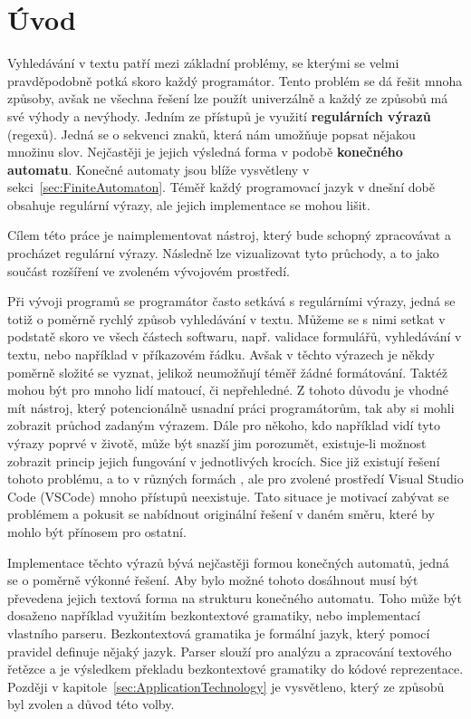 \chapter{Úvod}\label{sec:Introduction}

Vyhledávání v textu patří mezi základní problémy, se kterými se velmi pravděpodobně potká skoro každý programátor. 
Tento problém se dá řešit mnoha způsoby, avšak ne všechna řešení lze použít univerzálně a každý ze způsobů má své výhody a nevýhody.
Jedním ze přístupů je využití \textbf{regulárních výrazů} (regexů). 
Jedná se o sekvenci znaků, která nám umožňuje popsat nějakou množinu slov.
Nejčastěji je jejich výsledná forma v podobě \textbf{konečného automatu}. 
Konečné automaty jsou blíže vysvětleny v sekci~\ref{sec:FiniteAutomaton}.
Téměř každý programovací jazyk v dnešní době obsahuje regulární výrazy, ale jejich implementace se mohou lišit.

Cílem této práce je naimplementovat nástroj, který bude schopný zpracovávat a procházet regulární výrazy. 
Následně lze vizualizovat tyto průchody, a to jako součást rozšíření ve zvoleném vývojovém prostředí.

Při vývoji programů se programátor často setkává s regulárními výrazy, jedná se totiž o poměrně rychlý způsob vyhledávání v textu. 
Můžeme se s nimi setkat v podstatě skoro ve všech částech softwaru, např. validace formulářů, vyhledávání v textu, nebo například v příkazovém řádku.
Avšak v těchto výrazech je někdy poměrně složité se vyznat, jelikož neumožňují téměř žádné formátování. 
Taktéž mohou být pro mnoho lidí matoucí, či nepřehledné.
Z tohoto důvodu je vhodné mít nástroj, který potencionálně usnadní práci programátorům, tak aby si mohli zobrazit průchod zadaným výrazem.
Dále pro někoho, kdo například vidí tyto výrazy poprvé v životě, může být snazší jim porozumět, existuje-li možnost zobrazit princip jejich fungování v jednotlivých krocích.
Sice již existují řešení tohoto problému, a to v různých formách \cite{Dib, Regexper, RegExr}, ale pro zvolené prostředí Visual Studio Code (VSCode) mnoho přístupů neexistuje.
Tato situace je motivací zabývat se problémem a pokusit se nabídnout originální řešení v daném směru, které by mohlo být přínosem pro ostatní.

Implementace těchto výrazů bývá nejčastěji formou konečných automatů, jedná se o poměrně výkonné řešení. 
Aby bylo možné tohoto dosáhnout musí být převedena jejich textová forma na strukturu konečného automatu.
Toho může být dosaženo například využitím bezkontextové gramatiky, nebo implementací vlastního parseru.
Bezkontextová gramatika je formální jazyk, který pomocí pravidel definuje nějaký jazyk.
Parser slouží pro analýzu a zpracování textového řetězce a je výsledkem překladu bezkontextové gramatiky do kódové reprezentace.
Později v kapitole~\ref{sec:ApplicationTechnology} je vysvětleno, který ze způsobů byl zvolen a důvod této volby.

